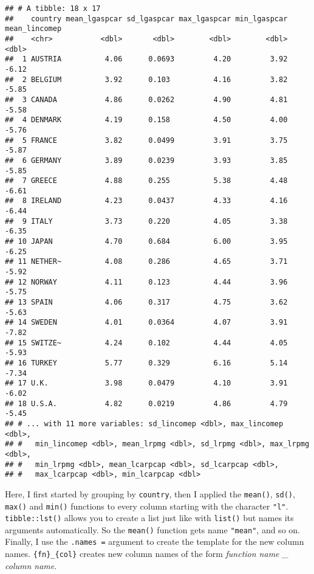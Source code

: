 \documentclass[
]{article}
\begin{document}
\begin{verbatim}
## # A tibble: 18 x 17
##    country mean_lgaspcar sd_lgaspcar max_lgaspcar min_lgaspcar mean_lincomep
##    <chr>           <dbl>       <dbl>        <dbl>        <dbl>         <dbl>
##  1 AUSTRIA          4.06      0.0693         4.20         3.92         -6.12
##  2 BELGIUM          3.92      0.103          4.16         3.82         -5.85
##  3 CANADA           4.86      0.0262         4.90         4.81         -5.58
##  4 DENMARK          4.19      0.158          4.50         4.00         -5.76
##  5 FRANCE           3.82      0.0499         3.91         3.75         -5.87
##  6 GERMANY          3.89      0.0239         3.93         3.85         -5.85
##  7 GREECE           4.88      0.255          5.38         4.48         -6.61
##  8 IRELAND          4.23      0.0437         4.33         4.16         -6.44
##  9 ITALY            3.73      0.220          4.05         3.38         -6.35
## 10 JAPAN            4.70      0.684          6.00         3.95         -6.25
## 11 NETHER~          4.08      0.286          4.65         3.71         -5.92
## 12 NORWAY           4.11      0.123          4.44         3.96         -5.75
## 13 SPAIN            4.06      0.317          4.75         3.62         -5.63
## 14 SWEDEN           4.01      0.0364         4.07         3.91         -7.82
## 15 SWITZE~          4.24      0.102          4.44         4.05         -5.93
## 16 TURKEY           5.77      0.329          6.16         5.14         -7.34
## 17 U.K.             3.98      0.0479         4.10         3.91         -6.02
## 18 U.S.A.           4.82      0.0219         4.86         4.79         -5.45
## # ... with 11 more variables: sd_lincomep <dbl>, max_lincomep <dbl>,
## #   min_lincomep <dbl>, mean_lrpmg <dbl>, sd_lrpmg <dbl>, max_lrpmg <dbl>,
## #   min_lrpmg <dbl>, mean_lcarpcap <dbl>, sd_lcarpcap <dbl>,
## #   max_lcarpcap <dbl>, min_lcarpcap <dbl>
\end{verbatim}

Here, I first started by grouping by \texttt{country}, then I applied the \texttt{mean()}, \texttt{sd()}, \texttt{max()} and
\texttt{min()} functions to every column starting with the character \texttt{"l"}. \texttt{tibble::lst()} allows you to
create a list just like with \texttt{list()} but names its arguments automatically. So the \texttt{mean()} function
gets name \texttt{"mean"}, and so on. Finally, I use the \texttt{.names\ =} argument to create the template for
the new column names. \texttt{\{fn\}\_\{col\}} creates new column names of the form \emph{function name \_ column name}.
\end{document}
